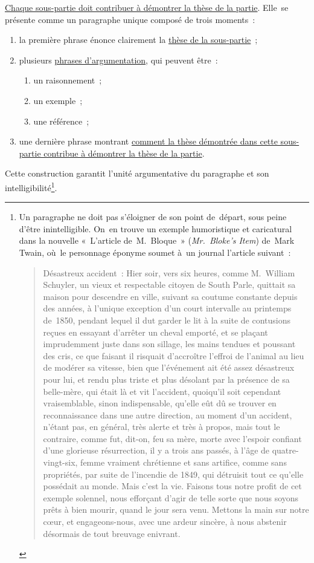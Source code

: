 \documentclass[a4paper,12pt]{report}
\begin{document}
\uline{Chaque sous-partie doit contribuer à démontrer la thèse de la partie}.
Elle se présente comme un paragraphe unique composé de trois moments :
\begin{enumerate}
\item la première phrase énonce clairement la \uline{thèse de la sous-partie} ;
\item plusieurs \uline{phrases d'argumentation}, qui peuvent être :
\begin{enumerate}
\item un raisonnement ;
\item un exemple ;
\item une référence ;
\end{enumerate}
\item une dernière phrase montrant \uline{comment la thèse démontrée dans cette
sous-partie contribue à démontrer la thèse de la partie}.
\end{enumerate}

Cette construction garantit l'unité argumentative du paragraphe et son
intelligibilité\footnote{Un paragraphe ne doit pas s'éloigner de son point de départ,
sous peine d'être inintelligible. On en trouve un exemple humoristique
et caricatural dans la nouvelle « L'article de M. Bloque » (\emph{Mr. Bloke's
Item}) de Mark Twain, où le personnage éponyme soumet à un journal
l'article suivant :
\begin{quote}
Désastreux accident : Hier soir, vers six heures, comme M. William
Schuyler, un vieux et respectable citoyen de South Parle, quittait sa
maison pour descendre en ville, suivant sa coutume constante depuis des
années, à l'unique exception d'un court intervalle au printemps de 1850,
pendant lequel il dut garder le lit à la suite de contusions reçues en
essayant d'arrêter un cheval emporté, et se plaçant imprudemment juste
dans son sillage, les mains tendues et poussant des cris, ce que faisant
il risquait d'accroître l'effroi de l'animal au lieu de modérer sa
vitesse, bien que l'événement ait été assez désastreux pour lui, et
rendu plus triste et plus désolant par la présence de sa belle-mère, qui
était là et vit l'accident, quoiqu'il soit cependant vraisemblable,
sinon indispensable, qu'elle eût dû se trouver en reconnaissance dans
une autre direction, au moment d'un accident, n'étant pas, en général,
très alerte et très à propos, mais tout le contraire, comme fut, dit-on,
feu sa mère, morte avec l'espoir confiant d'une glorieuse résurrection,
il y a trois ans passés, à l'âge de quatre-vingt-six, femme vraiment
chrétienne et sans artifice, comme sans propriétés, par suite de
l'incendie de 1849, qui détruisit tout ce qu'elle possédait au monde.
Mais c'est la vie. Faisons tous notre profit de cet exemple solennel,
nous efforçant d'agir de telle sorte que nous soyons prêts à bien
mourir, quand le jour sera venu. Mettons la main sur notre cœur, et
engageons-nous, avec une ardeur sincère, à nous abstenir désormais de
tout breuvage enivrant.
\end{quote}}.
\end{document}
